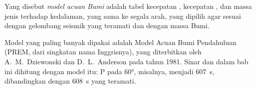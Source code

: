 \begin{definition}\label{def:g11:seismic-structure:reference-model}
Yang disebut \emph{model acuan Bumi} adalah tabel
kecepatan , kecepatan , dan massa jenis terhadap
kedalaman, yang sama ke segala arah, yang dipilih agar sesuai dengan  gelombang seismik yang teramati dan dengan massa Bumi.
\end{definition}

Model yang paling banyak dipakai adalah Model Acuan Bumi Pendahuluan
(PREM, dari singkatan nama Inggrisnya), yang diterbitkan oleh A.~M.~Dziewonski dan D.~L.~Anderson pada tahun
1981. Sinar dan  dalam bab ini dihitung dengan model itu:  P pada \ang{60}, misalnya, menjadi \qty{607}{s}, dibandingkan dengan
\qty{608}{s} yang teramati.

